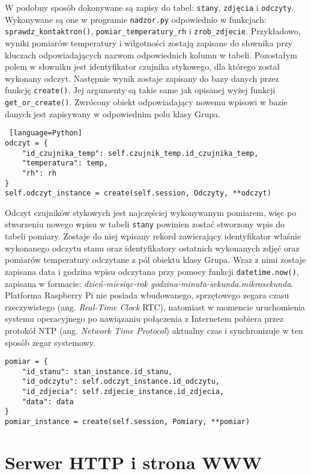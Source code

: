 \documentclass[a4paper,11pt,twoside]{article}
\begin{document}
W podobny sposób dokonywane są zapisy do tabel: \texttt{stany}, \texttt{zdjęcia} i \texttt{odczyty}. Wykonywane są one w programie \texttt{nadzor.py} odpowiednio w funkcjach: \linebreak\texttt{sprawdz{\_}kontaktron()}, \texttt{pomiar{\_}temperatury{\_}rh} i \texttt{zrob{\_}zdjecie}. Przykładowo, wyniki pomiarów temperatury i wilgotności zostają zapisane do słownika przy kluczach odpowiadających nazwom odpowiednich kolumn w tabeli. Pozostałym polem w słowniku jest identyfikator czujnika stykowego, dla którego został wykonany odczyt. Następnie wynik zostaje zapisany do bazy danych przez funkcję \texttt{create()}. Jej argumenty są takie same jak opisanej wyżej funkcji \texttt{get{\_}or{\_}create()}. Zwrócony obiekt odpowiadający nowemu wpisowi w bazie danych jest zapisywany w odpowiednim polu klasy Grupa.
\begin{lstlisting} [language=Python]
odczyt = {
	"id_czujnika_temp": self.czujnik_temp.id_czujnika_temp,
	"temperatura": temp,
	"rh": rh
}
self.odczyt_instance = create(self.session, Odczyty, **odczyt)
\end{lstlisting}

Odczyt czujników stykowych jest najczęściej wykonywanym pomiarem, więc po stworzeniu nowego wpisu w tabeli \texttt{stany} powinien zostać stworzony wpis do tabeli pomiary. Zostaje do niej wpisany rekord zawierający identyfikator właśnie wykonanego odczytu stanu oraz identyfikatory ostatnich wykonanych zdjęć oraz pomiarów temperatury odczytane z pól obiektu klasy Grupa. Wraz z nimi zostaje zapisana data i godzina wpisu odczytana przy pomocy funkcji \texttt{datetime.now()}, zapisana w formacie: \textit{dzień-miesiąc-rok godzina-minuta-sekunda.mikrosekunda}. Platforma Raspberry Pi nie posiada wbudowanego, sprzętowego zegara czasu rzeczywistego (ang. \textit{Real-Time Clock} RTC), natomiast w momencie uruchomienia systemu operacyjnego po nawiązaniu połączenia z Internetem pobiera przez protokół NTP (ang. \textit{Network Time Protocol}) aktualny czas i synchronizuje w ten sposób zegar systemowy.
\begin{lstlisting}
pomiar = {
	"id_stanu": stan_instance.id_stanu,
	"id_odczytu": self.odczyt_instance.id_odczytu,
	"id_zdjecia": self.zdjecie_instance.id_zdjecia,
	"data": data
}
pomiar_instance = create(self.session, Pomiary, **pomiar)
\end{lstlisting}

\newpage

\section{Serwer HTTP i strona WWW}
\end{document}
